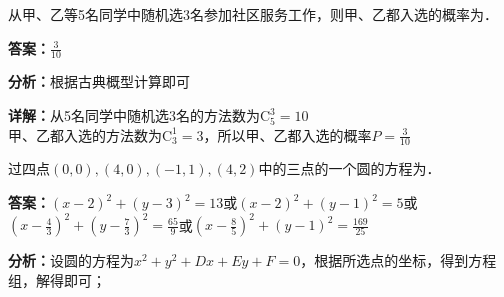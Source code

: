 \begin{question}[points=5]
从甲、乙等5名同学中随机选3名参加社区服务工作，则甲、乙都入选的概率为．
\fillin[{$\frac{3}{10}$}]
\begin{solution}
\textbf{答案：}$\frac{3}{10}$

\textbf{分析：}根据古典概型计算即可

\textbf{详解：}从5名同学中随机选3名的方法数为$\mathrm{C}_5^3 = 10$\\甲、乙都入选的方法数为$\mathrm{C}_3^1 = 3$，所以甲、乙都入选的概率$P = \frac{3}{10}$
\end{solution}
\end{question}

\begin{question}[points=5]
过四点$(0,0),(4,0),(-1,1),(4,2)$中的三点的一个圆的方程为．
\fillin[{$(x-2)^2 + (y-3)^2 = 13$或$(x-2)^2 + (y-1)^2 = 5$或$\left(x-\frac{4}{3}\right)^2 + \left(y-\frac{7}{3}\right)^2 = \frac{65}{9}$或$\left(x-\frac{8}{5}\right)^2 + (y-1)^2 = \frac{169}{25}$}]
\begin{solution}
\textbf{答案：}$(x-2)^2 + (y-3)^2 = 13$或$(x-2)^2 + (y-1)^2 = 5$或$\left(x-\frac{4}{3}\right)^2 + \left(y-\frac{7}{3}\right)^2 = \frac{65}{9}$或$\left(x-\frac{8}{5}\right)^2 + (y-1)^2 = \frac{169}{25}$

\textbf{分析：}设圆的方程为$x^2+y^2+Dx+Ey+F=0$，根据所选点的坐标，得到方程组，解得即可；


\end{solution}
\end{question}
